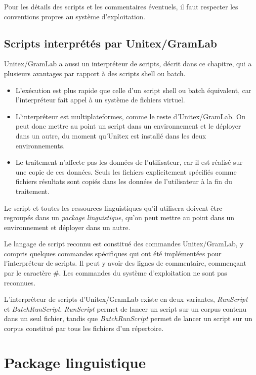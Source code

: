 \bigskip
\noindent Pour les détails des scripts et les commentaires éventuels, il faut respecter les conventions propres au système d'exploitation.

\subsection{Scripts interprétés par Unitex/GramLab}

Unitex/GramLab a aussi un interpréteur de scripts, décrit dans ce chapitre, qui a plusieurs avantages par rapport à des scripts shell ou batch.
\begin{itemize}
    \item L'exécution est plus rapide que celle d'un script shell ou batch équivalent, car l'interpréteur fait appel à un système de fichiers virtuel.
    \item L'interpréteur est multiplateformes, comme le reste d'Unitex/GramLab. On peut donc mettre au point un script dans un environnement et le déployer dans un autre, du moment qu'Unitex est installé dans les deux environnements.
    \item Le traitement n'affecte pas les données de l'utilisateur, car il est réalisé sur une copie de ces données. Seuls les fichiers explicitement spécifiés comme fichiers résultats sont copiés dans les données de l'utilisateur à la fin du traitement.
\end{itemize}

\bigskip
\noindent Le script et toutes les ressources linguistiques qu'il utilisera doivent être regroupés dans un \emph{package linguistique}, qu'on peut mettre au point dans un environnement et déployer dans un autre.

\bigskip
\noindent Le langage de script reconnu est constitué des commandes Unitex/GramLab, y compris quelques commandes spécifiques qui ont été implémentées pour l'interpréteur de scripts. Il peut y avoir des lignes de commentaire, commençant par le caractère \#. Les commandes du système d'exploitation ne sont pas reconnues.

\bigskip
\noindent L'interpréteur de scripts d'Unitex/GramLab existe en deux variantes, \emph{RunScript} et \emph{BatchRunScript}. \emph{RunScript} permet de lancer un script sur un corpus contenu dans un seul fichier, tandis que \emph{BatchRunScript} permet de lancer un script sur un corpus constitué par tous les fichiers d'un répertoire.

\section{Package linguistique}

